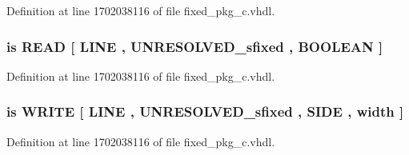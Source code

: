 Definition at line 1702038116 of file fixed\+\_\+pkg\+\_\+c.\+vhdl.

\hypertarget{classfixed__pkg_af8f7ec3cb30bef85c556943efb7067cd}{}
\subsubsection[{bread}]{ {\bfseries \textcolor{keywordflow}{is}\textcolor{vhdlchar}{ }\textcolor{vhdlchar}{R\+E\+A\+D}\textcolor{vhdlchar}{ }\textcolor{vhdlchar}{\mbox{[}}\textcolor{vhdlchar}{ }\textcolor{vhdlchar}{L\+I\+N\+E}\textcolor{vhdlchar}{ }\textcolor{vhdlchar}{,}\textcolor{vhdlchar}{ }{\bfseries {\bf U\+N\+R\+E\+S\+O\+L\+V\+E\+D\+\_\+sfixed}} \textcolor{vhdlchar}{ }\textcolor{vhdlchar}{,}\textcolor{vhdlchar}{ }\textcolor{comment}{B\+O\+O\+L\+E\+A\+N}\textcolor{vhdlchar}{ }\textcolor{vhdlchar}{\mbox{]}}\textcolor{vhdlchar}{ }} \hspace{0.3cm}{\ttfamily [Alias]}}\label{classfixed__pkg_af8f7ec3cb30bef85c556943efb7067cd}


Definition at line 1702038116 of file fixed\+\_\+pkg\+\_\+c.\+vhdl.

\hypertarget{classfixed__pkg_a72de5d43493c478c7a90063e495a4136}{}
\subsubsection[{bwrite}]{ {\bfseries \textcolor{keywordflow}{is}\textcolor{vhdlchar}{ }\textcolor{vhdlchar}{W\+R\+I\+T\+E}\textcolor{vhdlchar}{ }\textcolor{vhdlchar}{\mbox{[}}\textcolor{vhdlchar}{ }\textcolor{vhdlchar}{L\+I\+N\+E}\textcolor{vhdlchar}{ }\textcolor{vhdlchar}{,}\textcolor{vhdlchar}{ }{\bfseries {\bf U\+N\+R\+E\+S\+O\+L\+V\+E\+D\+\_\+sfixed}} \textcolor{vhdlchar}{ }\textcolor{vhdlchar}{,}\textcolor{vhdlchar}{ }\textcolor{vhdlchar}{S\+I\+D\+E}\textcolor{vhdlchar}{ }\textcolor{vhdlchar}{,}\textcolor{vhdlchar}{ }\textcolor{vhdlchar}{width}\textcolor{vhdlchar}{ }\textcolor{vhdlchar}{\mbox{]}}\textcolor{vhdlchar}{ }} \hspace{0.3cm}{\ttfamily [Alias]}}\label{classfixed__pkg_a72de5d43493c478c7a90063e495a4136}


Definition at line 1702038116 of file fixed\+\_\+pkg\+\_\+c.\+vhdl.

